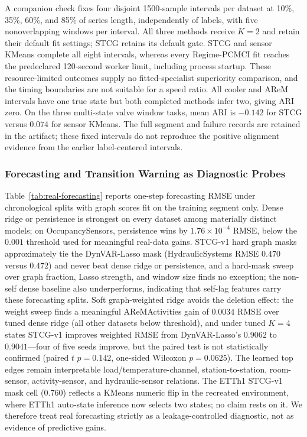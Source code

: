 \documentclass[sigconf,anonymous]{acmart}
\begin{document}
A companion check fixes four disjoint 1500-sample intervals per dataset at 10\%, 35\%, 60\%, and 85\% of series length, independently of labels, with five nonoverlapping windows per interval.
All three methods receive $K{=}2$ and retain their default fit settings; STCG retains its default gate.
STCG and sensor KMeans complete all eight intervals, whereas every Regime-PCMCI fit reaches the predeclared 120-second worker limit, including process startup. These resource-limited outcomes supply no fitted-specialist superiority comparison, and the timing boundaries are not suitable for a speed ratio.
All cooler and AReM intervals have one true state but both completed methods infer two, giving ARI zero. On the three multi-state valve window tasks, mean ARI is $-0.142$ for STCG versus $0.074$ for sensor KMeans.
The full segment and failure records are retained in the artifact; these fixed intervals do not reproduce the positive alignment evidence from the earlier label-centered intervals.

\subsubsection{Forecasting and Transition Warning as Diagnostic Probes}
\label{sec:exp-real-forecasting}

Table~\ref{tab:real-forecasting} reports one-step forecasting RMSE under chronological splits with graph scores fit on the training segment only.
Dense ridge or persistence is strongest on every dataset among materially distinct models; on OccupancySensors, persistence wins by $1.76\times 10^{-4}$ RMSE, below the $0.001$ threshold used for meaningful real-data gains.
STCG-v1 hard graph masks approximately tie the DynVAR-Lasso mask (HydraulicSystems RMSE $0.470$ versus $0.472$) and never beat dense ridge or persistence, and a hard-mask sweep over graph fraction, Lasso strength, and window size finds no exception; the non-self dense baseline also underperforms, indicating that self-lag features carry these forecasting splits.
Soft graph-weighted ridge avoids the deletion effect: the weight sweep finds a meaningful AReMActivities gain of $0.0034$ RMSE over tuned dense ridge (all other datasets below threshold), and under tuned $K{=}4$ states STCG-v1 improves weighted RMSE from DynVAR-Lasso's $0.9062$ to $0.9041$---four of five seeds improve, but the paired test is not statistically confirmed (paired $t$ $p=0.142$, one-sided Wilcoxon $p=0.0625$).
The learned top edges remain interpretable load/temperature-channel, station-to-station, room-sensor, activity-sensor, and hydraulic-sensor relations.
The ETTh1 STCG-v1 mask cell ($0.760$) reflects a KMeans numeric flip in the recreated environment, where ETTh1 auto-state inference now selects two states; no claim rests on it.
We therefore treat real forecasting strictly as a leakage-controlled diagnostic, not as evidence of predictive gains.
\end{document}
